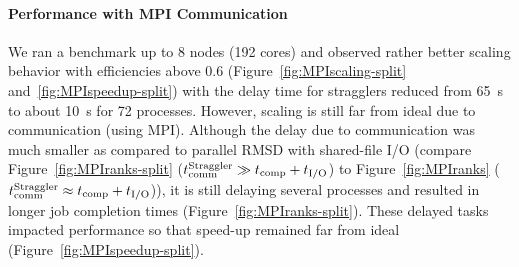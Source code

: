 \paragraph{Performance with MPI Communication}
We ran a benchmark up to 8 nodes (192 cores) and observed rather better scaling behavior with efficiencies above 0.6 (Figure~\ref{fig:MPIscaling-split} and~\ref{fig:MPIspeedup-split}) with the delay time for stragglers reduced from 65~s to about 10~s for 72 processes. 
However, scaling is still far from ideal due to communication (using MPI). 
Although the delay due to communication was much smaller as compared to parallel RMSD with shared-file I/O (compare Figure~\ref{fig:MPIranks-split} ($t_{\text{comm}}^{\text{Straggler}} \gg {t}_{\text{comp}}+{t}_{\text{I/O}}$) to Figure~\ref{fig:MPIranks} ($t_{\text{comm}}^{\text{Straggler}} \approx {t}_{\text{comp}}+{t}_{\text{I/O}}$)), it is still delaying several processes and resulted in longer job completion times (Figure~\ref{fig:MPIranks-split}). 
These delayed tasks impacted performance so that speed-up remained far from ideal (Figure~\ref{fig:MPIspeedup-split}).

